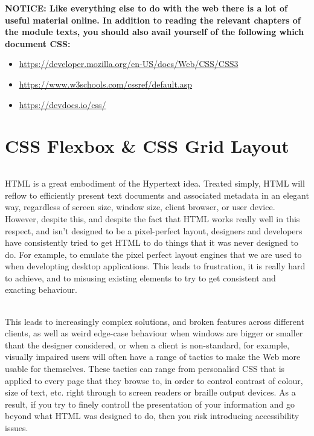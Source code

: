 \documentclass[10pt, a4paper]{article}
\begin{document}
\begin{framed}
{\bf{NOTICE:} Like everything else to do with the web there is a lot of useful material online. In addition to reading the relevant chapters of the module texts, you should also avail yourself of the following which document CSS:
\begin{itemize}
\item \url{https://developer.mozilla.org/en-US/docs/Web/CSS/CSS3}
\item \url{https://www.w3schools.com/cssref/default.asp}
\item \url{https://devdocs.io/css/}
\end{itemize}

}
\end{framed}

\part{CSS Flexbox \& CSS Grid Layout}
\paragraph{} HTML is a great embodiment of the Hypertext idea. Treated simply, HTML will reflow to efficiently present text documents and associated metadata in an elegant way, regardless of screen size, window size, client browser, or user device. However, despite this, and despite the fact that HTML works really well in this respect, and isn't designed to be a pixel-perfect layout, designers and developers have consistently tried to get HTML to do things that it was never designed to do. For example, to emulate the pixel perfect layout engines that we are used to when developting desktop applications. This leads to frustration, it is really hard to achieve, and to misusing existing elements to try to get consistent and exacting behaviour.

\paragraph{} This leads to increasingly complex solutions, and broken features across different clients, as well as weird edge-case behaviour when windows are bigger or smaller thant the designer considered, or when a client is non-standard, for example, visually impaired users will often have a range of tactics to make the Web more usable for themselves. These tactics can range from personalisd CSS that is applied to every page that they browse to, in order to control contrast of colour, size of text, etc. right through to screen readers or braille output devices. As a result, if you try to finely controll the presentation of your information and go beyond what HTML was designed to do, then you risk introducing accessibility issues.
\end{document}
